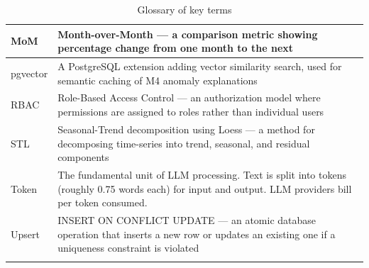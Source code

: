 \documentclass[12pt,a4paper,twoside]{report}
\begin{document}
\begin{longtable}{|l|X|}
\hline
MoM & Month-over-Month — a comparison metric showing percentage change from one month to the next \\
\hline
pgvector & A PostgreSQL extension adding vector similarity search, used for semantic caching of M4 anomaly explanations \\
\hline
RBAC & Role-Based Access Control — an authorization model where permissions are assigned to roles rather than individual users \\
\hline
STL & Seasonal-Trend decomposition using Loess — a method for decomposing time-series into trend, seasonal, and residual components \\
\hline
Token & The fundamental unit of LLM processing. Text is split into tokens (roughly 0.75 words each) for input and output. LLM providers bill per token consumed. \\
\hline
Upsert & INSERT ON CONFLICT UPDATE — an atomic database operation that inserts a new row or updates an existing one if a uniqueness constraint is violated \\
\hline

\caption{Glossary of key terms}
\label{tab:glossary}
\end{longtable}
\end{document}
